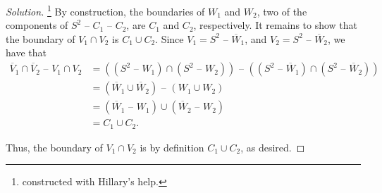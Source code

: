 \documentclass[11pt]{article}
\newenvironment{solution}
  {\renewcommand\qedsymbol{$\blacksquare$}\begin{proof}[Solution]}
  {\end{proof}}
\begin{document}
\begin{enumerate}[a)]
    \begin{solution}\footnote{constructed with Hillary's help.}
    By construction, the boundaries of $W_1$ and $W_2$, two of the components of $S^2 \text{ -- } C_1 \text{ -- } C_2$, are $C_1$ and $C_2$, respectively. 
    It remains to show that the boundary of $V_1 \cap V_2$ is $C_1 \cup C_2$. Since $V_1 = S^2 \text{ -- } \overline{W}_1$, and $V_2 = S^2 \text{ -- } \overline{W}_2$, we have that
    \begin{align*}
        \overline{V}_1 \cap \overline{V}_2 \text{ -- } V_1 \cap V_2 &= ((S^2 \text{ -- } W_1) \cap (S^2 \text{ -- } W_2)) \text{ -- } ((S^2 \text{ -- } \overline{W}_1) \cap (S^2 \text{ -- } \overline{W}_2)) \\
        &= (\overline{W}_1 \cup \overline{W}_2) \text{ -- } (W_1 \cup W_2) \\
        &= (\overline{W}_1 \text{ -- } W_1) \cup (\overline{W}_2 \text{ -- } W_2) \\
        &= C_1 \cup C_2.
    \end{align*}

    Thus, the boundary of $V_1 \cap V_2$ is by definition $C_1 \cup C_2$, as desired.
    \end{solution}
\end{enumerate}
\end{document}
